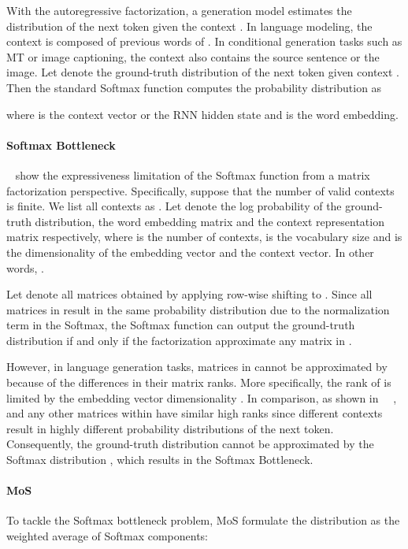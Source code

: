 \documentclass[letterpaper]{article} \usepackage{aaai19}  \usepackage{times}  \usepackage{helvet}  \usepackage{courier}  \usepackage{url}  \usepackage{graphicx}  \frenchspacing  \usepackage{booktabs}
\begin{document}
With the autoregressive factorization, a generation model estimates the distribution of the next token  given the context . In language modeling, the context is composed of previous words of . In conditional generation tasks such as MT or image captioning, the context also contains the source sentence or the image. Let  denote the ground-truth distribution of the next token given context . Then the standard Softmax function computes the probability distribution  as 


where  is the context vector or the RNN hidden state and  is the word embedding.

\paragraph{Softmax Bottleneck}\citeauthor{yang2017breaking}~ show the expressiveness limitation of the Softmax function from a matrix factorization perspective. 
Specifically, suppose that the number of valid contexts is finite. We list all contexts as . 
Let  denote the log probability of the ground-truth distribution, the word embedding matrix and the context representation matrix respectively, where  is the number of contexts,  is the vocabulary size and  is the dimensionality of the embedding vector and the context vector. 
In other words, . 

Let  denote all matrices obtained by applying row-wise shifting to .
Since all matrices in  result in the same probability distribution due to the normalization term in the Softmax, the Softmax function can output the ground-truth distribution  if and only if the factorization  approximate any matrix in .

However, in language generation tasks, matrices in  cannot be approximated by  because of the differences in their matrix ranks. More specifically, the rank of  is limited by the embedding vector dimensionality . In comparison, as shown in ~\citeauthor{yang2017breaking}~,  and any other matrices within  have similar high ranks since different contexts result in highly different probability distributions of the next token. Consequently, the ground-truth distribution  cannot be approximated by the Softmax distribution , which results in the Softmax Bottleneck. 

\paragraph{MoS}
To tackle the Softmax bottleneck problem, MoS formulate the distribution as the weighted average of  Softmax components:
\end{document}

